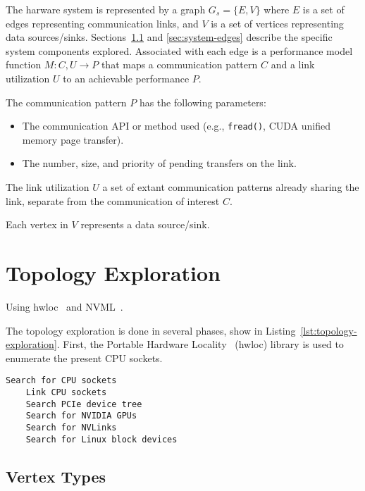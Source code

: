 The harware system is represented by a graph $G_s = \{E,V\}$ where $E$ is a set of edges representing communication links, and $V$ is a set of vertices representing data sources/sinks.
Sections~\ref{sec:system-vertices} and \ref{sec:system-edges} describe the specific system components explored.
Associated with each edge is a performance model function $M: C,U \rightarrow P$ that maps a communication pattern $C$ and a link utilization $U$ to an achievable performance $P$.

The communication pattern $P$ has the following parameters:
\begin{itemize}
    \item The communication API or method used (e.g., \texttt{fread()}, CUDA unified memory page transfer).
    \item The number, size, and priority of pending transfers on the link.
\end{itemize}

The link utilization $U$ a set of extant communication patterns already sharing the link, separate from the communication of interest $C$.



Each vertex in $V$ represents a data source/sink.



%
%
\section{Topology Exploration}
\label{sec:topology-exploration}

Using hwloc~\cite{broquedis2010hwloc} and NVML~\cite{nvidia2017nvml}.

The topology exploration is done in several phases, show in Listing~\ref{lst:topology-exploration}.
First, the Portable Hardware Locality~\cite{broquedis2010hwloc} (hwloc) library is used to enumerate the present CPU sockets.


\begin{minipage}[h]{\textwidth}
\begin{lstlisting}[caption={My Caption},captionpos=b,label=lst:topology-exploration]
    Search for CPU sockets
    Link CPU sockets
    Search PCIe device tree
    Search for NVIDIA GPUs
    Search for NVLinks
    Search for Linux block devices
\end{lstlisting}
\end{minipage}


\subsection{Vertex Types}
\label{sec:system-vertices}

